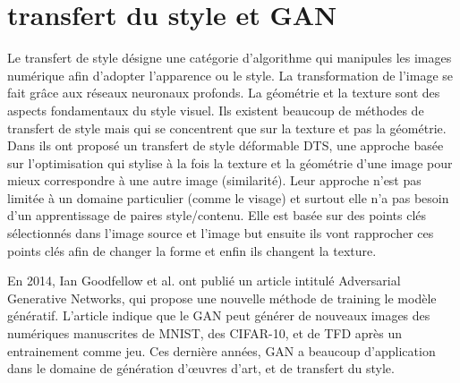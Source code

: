 \section{transfert du style et GAN}

Le transfert de style désigne une catégorie d'algorithme qui manipules les images numérique afin d'adopter l'apparence ou le style. La transformation de l'image se fait grâce aux réseaux neuronaux profonds. La géométrie et la texture sont des aspects fondamentaux du style visuel. Ils existent beaucoup de méthodes de transfert de style mais qui se concentrent que sur la texture et pas la géométrie. Dans \cite{kim2020deformable} ils ont proposé un transfert de style déformable DTS, une approche basée sur l'optimisation qui stylise à la fois la texture et la géométrie d'une image pour mieux correspondre à une autre image (similarité). Leur approche n'est pas limitée à un domaine particulier (comme le visage) et surtout elle n'a pas besoin d'un apprentissage de paires style/contenu. Elle est basée sur des points clés sélectionnés dans l'image source et l'image but ensuite ils vont rapprocher ces points clés afin de changer la forme et enfin ils changent la texture.

En 2014, Ian Goodfellow et al. \cite{goodfellow2014generative} ont publié un article intitulé \og{}Adversarial Generative Networks\fg{}, qui propose une nouvelle méthode de training le modèle génératif. L'article indique que le GAN peut générer de nouveaux images des numériques manuscrites de MNIST, des CIFAR-10, et de TFD après un entrainement comme jeu. Ces dernière années, GAN a beaucoup d'application dans le domaine de génération d'œuvres d'art, et de transfert du style.





